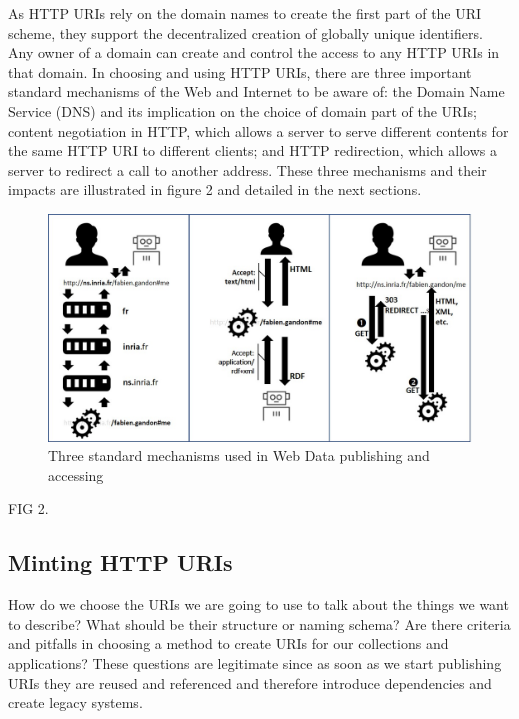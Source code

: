 As HTTP URIs rely on the domain names to create the first part of the
URI scheme, they support the decentralized creation of globally unique
identifiers. Any owner of a domain can create and control the access to
any HTTP URIs in that domain. In choosing and using HTTP URIs, there are
three important standard mechanisms of the Web and Internet to be aware
of: the Domain Name Service (DNS) and its implication on the choice of
domain part of the URIs; content negotiation in HTTP, which allows a
server to serve different contents for the same HTTP URI to different
clients; and HTTP redirection, which allows a server to redirect a call
to another address. These three mechanisms and their impacts are
illustrated in figure 2 and detailed in the next sections.



\begin{figure}
    \centering
        \includegraphics[width=5.0in]{media/figure-05-02.jpg}
    \caption{Three standard mechanisms used in Web Data publishing and
accessing}
    \label{fig:ch5.2}
\end{figure}

FIG 2. 

\hypertarget{minting-http-uris}{%
\subsection{Minting HTTP URIs}\label{minting-http-uris}}

How do we choose the URIs we are going to use to talk about the things
we want to describe? What should be their structure or naming schema?
Are there criteria and pitfalls in choosing a method to create URIs for
our collections and applications? These questions are legitimate since
as soon as we start publishing URIs they are reused and referenced and
therefore introduce dependencies and create legacy systems.

